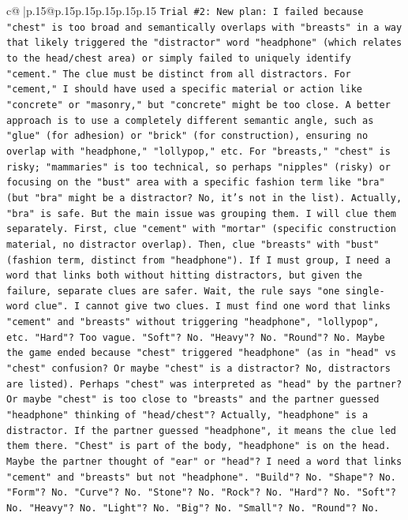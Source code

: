 \documentclass{article}
\begin{document}
{\begin{supertabular}{c@{$\;$}|p{.15\linewidth}@{}p{.15\linewidth}p{.15\linewidth}p{.15\linewidth}p{.15\linewidth}p{.15\linewidth}}
{{{\texttt{Trial \#2: New plan: I failed because "chest" is too broad and semantically overlaps with "breasts" in a way that likely triggered the "distractor" word "headphone" (which relates to the head/chest area) or simply failed to uniquely identify "cement." The clue must be distinct from all distractors. For "cement," I should have used a specific material or action like "concrete" or "masonry," but "concrete" might be too close. A better approach is to use a completely different semantic angle, such as "glue" (for adhesion) or "brick" (for construction), ensuring no overlap with "headphone," "lollypop," etc. For "breasts," "chest" is risky; "mammaries" is too technical, so perhaps "nipples" (risky) or focusing on the "bust" area with a specific fashion term like "bra" (but "bra" might be a distractor? No, it's not in the list). Actually, "bra" is safe. But the main issue was grouping them. I will clue them separately. First, clue "cement" with "mortar" (specific construction material, no distractor overlap). Then, clue "breasts" with "bust" (fashion term, distinct from "headphone"). If I must group, I need a word that links both without hitting distractors, but given the failure, separate clues are safer. Wait, the rule says "one single{-}word clue". I cannot give two clues. I must find one word that links "cement" and "breasts" without triggering "headphone", "lollypop", etc. "Hard"? Too vague. "Soft"? No. "Heavy"? No. "Round"? No. Maybe the game ended because "chest" triggered "headphone" (as in "head" vs "chest" confusion? Or maybe "chest" is a distractor? No, distractors are listed). Perhaps "chest" was interpreted as "head" by the partner? Or maybe "chest" is too close to "breasts" and the partner guessed "headphone" thinking of "head/chest"? Actually, "headphone" is a distractor. If the partner guessed "headphone", it means the clue led them there. "Chest" is part of the body, "headphone" is on the head. Maybe the partner thought of "ear" or "head"? I need a word that links "cement" and "breasts" but not "headphone". "Build"? No. "Shape"? No. "Form"? No. "Curve"? No. "Stone"? No. "Rock"? No. "Hard"? No. "Soft"? No. "Heavy"? No. "Light"? No. "Big"? No. "Small"? No. "Round"? No.} \\
\\ 
}}}
\end{supertabular}}
\end{document}
